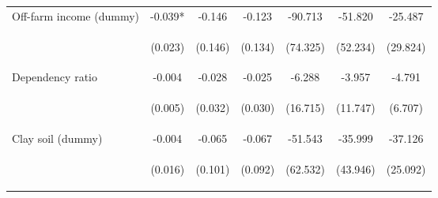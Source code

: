 \begin{center}
\begin{tabular}{lcccccc}
Off-farm income (dummy) & -0.039* & -0.146 & -0.123 & -90.713 & -51.820 & -25.487 \\
\vspace{4pt} & \begin{footnotesize}(0.023)\end{footnotesize} & \begin{footnotesize}(0.146)\end{footnotesize} & \begin{footnotesize}(0.134)\end{footnotesize} & \begin{footnotesize}(74.325)\end{footnotesize} & \begin{footnotesize}(52.234)\end{footnotesize} & \begin{footnotesize}(29.824)\end{footnotesize} \\
Dependency ratio & -0.004 & -0.028 & -0.025 & -6.288 & -3.957 & -4.791 \\
\vspace{4pt} & \begin{footnotesize}(0.005)\end{footnotesize} & \begin{footnotesize}(0.032)\end{footnotesize} & \begin{footnotesize}(0.030)\end{footnotesize} & \begin{footnotesize}(16.715)\end{footnotesize} & \begin{footnotesize}(11.747)\end{footnotesize} & \begin{footnotesize}(6.707)\end{footnotesize} \\
Clay soil (dummy) & -0.004 & -0.065 & -0.067 & -51.543 & -35.999 & -37.126 \\
\vspace{4pt} & \begin{footnotesize}(0.016)\end{footnotesize} & \begin{footnotesize}(0.101)\end{footnotesize} & \begin{footnotesize}(0.092)\end{footnotesize} & \begin{footnotesize}(62.532)\end{footnotesize} & \begin{footnotesize}(43.946)\end{footnotesize} & \begin{footnotesize}(25.092)\end{footnotesize} \\

\end{tabular}
\end{center}
